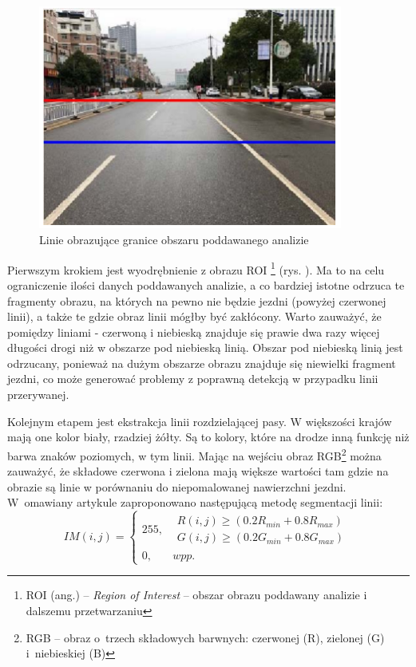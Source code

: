 \begin{figure}
  \centering
  \includegraphics[width=10cm]{img/roi.png}
  \caption{Linie obrazujące granice obszaru poddawanego analizie\cite{T3}}
  \label{fig:roi}
\end{figure}

Pierwszym krokiem jest wyodrębnienie z obrazu ROI \footnote{ROI (ang.) -- \textit{Region of Interest} -- obszar obrazu poddawany analizie i dalszemu przetwarzaniu} (rys. \label{fig:roi}). %
Ma to na celu ograniczenie ilości danych poddawanych analizie, a co bardziej istotne odrzuca te fragmenty obrazu, na których na pewno nie będzie jezdni (powyżej czerwonej linii), a także te gdzie obraz linii mógłby być zakłócony. 
Warto zauważyć, że pomiędzy liniami - czerwoną i niebieską znajduje się prawie dwa razy więcej długości drogi niż w obszarze pod niebieską linią. Obszar pod niebieską linią jest odrzucany, ponieważ na dużym obszarze obrazu znajduje się niewielki fragment jezdni, co może generować problemy z poprawną detekcją w przypadku linii przerywanej.

Kolejnym etapem jest ekstrakcja linii rozdzielającej pasy. %
W większości krajów mają one kolor biały, rzadziej żółty. 
Są to kolory, które na drodze inną funkcję niż barwa znaków poziomych, w tym linii. %
Mając na wejściu obraz RGB\footnote{RGB -- obraz o~trzech składowych barwnych: czerwonej (R), zielonej (G) i~niebieskiej (B)} można zauważyć, że składowe czerwona i zielona mają większe wartości tam gdzie na obrazie są linie w porównaniu do niepomalowanej nawierzchni jezdni. %
W~omawiany artykule zaproponowano następującą metodę segmentacji linii:
\begin{equation}
\label{eq:IMij}
IM(i,j)=\left\{\begin{matrix}
255, & \begin{matrix}
R(i,j)\geq (0.2R_{min}+0.8R_{max})\\ 
G(i,j)\geq (0.2G_{min}+0.8G_{max})
\end{matrix}\\ 
0, & wpp.
\end{matrix}\right.
\end{equation}

